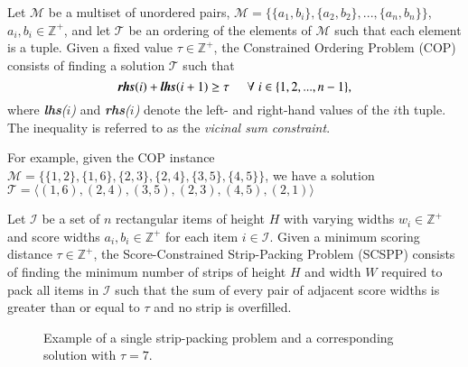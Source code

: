 \documentclass{elsarticle}
\begin{document}
\begin{definition}
	Let $\mathcal{M}$ be a multiset of unordered pairs, $\mathcal{M} = \{\{a_1, b_i\}, \{a_2, b_2\},..., \{a_n, b_n\}\}$, $a_i, b_i \in \mathbb{Z}^+$, and let $\mathcal{T}$ be an ordering of the elements of $\mathcal{M}$ such that each element is a tuple. Given a fixed value $\tau \in \mathbb{Z}^+$, the Constrained Ordering Problem (COP) consists of finding a solution $\mathcal{T}$ such that
	\begin{equation}
		\label{eqn:vsc}
		\emph{\textbf{rhs}}(i) + \emph{\textbf{lhs}}(i+1) \geq \tau \hspace{5mm} \forall \hspace{1mm} i \in \{1,2,..., n-1\},
	\end{equation}
	where \emph{\textbf{lhs}($i$)} and \emph{\textbf{rhs}($i$)} denote the left- and right-hand values of the $i$th tuple. The inequality is referred to as the \emph{vicinal sum constraint}.
\end{definition}

For example, given the COP instance $\mathcal{M} = \{\{1,2\}, \{1,6\}, \{2,3\}, \{2,4\}, \{3,5\}, \{4,5\}\}$, we have a solution $\mathcal{T} = \langle(1,6), (2,4), (3,5), (2,3), (4,5), (2,1)\rangle$

\begin{definition}
	Let $\mathcal{I}$ be a set of $n$ rectangular items of height $H$ with varying widths $w_i \in \mathbb{Z}^+$ and score widths $a_i, b_i \in \mathbb{Z}^+$ for each item $i \in \mathcal{I}$. Given a minimum scoring distance $\tau \in \mathbb{Z}^+$, the Score-Constrained Strip-Packing Problem (SCSPP) consists of finding the minimum number of strips of height $H$ and width $W$ required to pack all items in $\mathcal{I}$ such that the sum of every pair of adjacent score widths is greater than or equal to $\tau$ and no strip is overfilled.
\end{definition}

\begin{figure}	
	\centering
	\begin{subfigure}[h]{0.45\textwidth}
		
		\label{fig:items}
	\end{subfigure} 
	\begin{subfigure}[h]{0.75\textwidth}
		
		\label{fig:itemsaligned}
	\end{subfigure}
	\caption{Example of a single strip-packing problem and a corresponding solution with $\tau = 7$.}
	\label{fig:items/aligned}
\end{figure}
\end{document}
